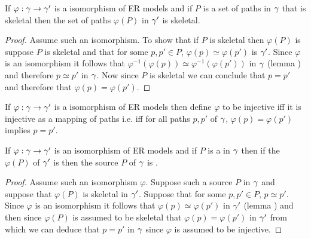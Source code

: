 \begin{lemma}
If $\varphi: \gamma \rightarrow \gamma'$ is a isomorphism of ER models and
if $P$ is a  set of paths in $\gamma$ that is skeletal then the set of paths $\varphi(P)$ in $\gamma'$ is skeletal. 
\end{lemma}
\begin{proof}
Assume such an isomorphism. To show that if $P$ is skeletal then $\varphi(P)$ is suppose $P$ is skeletal and that for some $p,p' \in P$,  $\varphi(p) \simeq \varphi(p')$ is $\gamma'$.  Since $\varphi$ is an isomorphism
it follows that $\varphi^{-1}(\varphi(p)) \simeq \varphi^{-1}(\varphi(p'))$ in $\gamma$ (lemma ) and therefore $p \simeq p'$ in
$\gamma$. Now since $P$ is skeletal we can conclude that $p=p'$ and therefore that $\varphi(p)=\varphi(p')$.
\end{proof}

\begin{definition}
If $\varphi: \gamma \rightarrow \gamma'$ is a isomorphism of ER models then define $\varphi$ to be injective iff
it is injective as a mapping of paths i.e. iff  for all paths $p,p'$ of $\gamma$, $\varphi(p)=\varphi(p')$ implies $p=p'$.
\end{definition}


\begin{lemma}
If $\varphi: \gamma \rightarrow \gamma'$ is an  isomorphism of ER models and
if $P$ is a   in $\gamma$ then if the  $\varphi(P)$ of $\gamma'$ is  
 then the source $P$ of $\gamma$ is . 
\end{lemma}
\begin{proof}
Assume such an isomorphism $\varphi$. Suppose such a source $P$ in $\gamma$ and suppose that $\varphi(P)$ is skeletal in $\gamma'$.  Suppose that  for some $p,p' \in P$, $p \simeq p'$. Since $\varphi$ is an isomorphism it follows that $\varphi(p) \simeq \varphi(p')$ in $\gamma'$ (lemma ) and then since $\varphi(P)$ is assumed to be skeletal 
that $\varphi(p) = \varphi(p')$ in $\gamma'$
 from which we can deduce that $p=p'$ in $\gamma$ since $\varphi$ is assumed to be injective. 
\end{proof}

